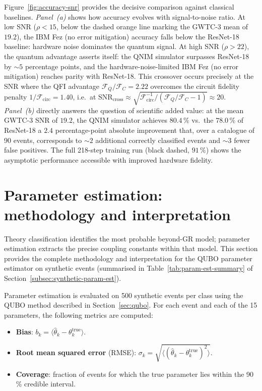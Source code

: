 \documentclass[11pt,a4paper, english]{book}
\theoremstyle{plain}
\theoremstyle{definition}
\numberwithin{equation}{chapter}
\numberwithin{figure}{chapter}
\numberwithin{table}{chapter}
\begin{document}
Figure~\ref{fig:accuracy-snr} provides the decisive comparison against
classical baselines.
\emph{Panel~(a)} shows how accuracy evolves with signal-to-noise ratio.
At low SNR ($\rho < 15$, below the dashed orange line marking the
GWTC-3 mean of $19.2$), the IBM Fez (no error mitigation) accuracy falls below the
ResNet-18 baseline: hardware noise dominates the quantum signal.  At
high SNR ($\rho > 22$), the quantum advantage asserts itself: the QNIM
simulator surpasses ResNet-18 by $\sim\!5$ percentage points, and the
hardware-noise-limited IBM Fez (no error mitigation) reaches parity with ResNet-18.
This crossover occurs precisely at the SNR where
the QFI advantage $\mathcal{F}_Q/\mathcal{F}_C = 2.22$ overcomes the
circuit fidelity penalty $1/\mathcal{F}_\mathrm{circ} = 1.40$, i.e.\ at
$\mathrm{SNR}_\mathrm{cross} \approx \sqrt{\mathcal{F}_\mathrm{circ}^{-1}
/ (\mathcal{F}_Q/\mathcal{F}_C - 1)} \approx 20$.
\emph{Panel~(b)} directly answers the question of scientific added
value: at the mean GWTC-3 SNR of $19.2$, the QNIM simulator achieves
$80.4\,\%$ vs.\ the $78.0\,\%$ of ResNet-18  a $2.4$ percentage-point
absolute improvement that, over a catalogue of 90 events, corresponds
to $\sim\!2$ additional correctly classified events and $\sim\!3$ fewer
false positives.  The full 218-step training run (black dashed,
$91\,\%$) shows the asymptotic performance accessible with
improved hardware fidelity.

\section{Parameter estimation: methodology and interpretation}
\label{app:pe-detail}

Theory classification identifies the most probable beyond-GR model; parameter
estimation extracts the precise coupling constants within that model.  This section
provides the complete methodology and interpretation for the QUBO parameter
estimator on synthetic events (summarised in Table~\ref{tab:param-est-summary}
of Section~\ref{subsec:synthetic-param-est}).

Parameter estimation is evaluated on 500 synthetic events per class
using the QUBO method described in Section~\ref{sec:qubo}.  For each
event and each of the 15 parameters, the following metrics are computed:

\begin{itemize}
  \item \textbf{Bias}: $b_k = \langle\hat{\theta}_k - \theta_k^\mathrm{true}\rangle$.
  \item \textbf{Root mean squared error} (RMSE):
        $\sigma_k = \sqrt{\langle(\hat{\theta}_k - \theta_k^\mathrm{true})^2\rangle}$.
  \item \textbf{Coverage}: fraction of events for which the true parameter
        lies within the 90\,\% credible interval.
\end{itemize}
\end{document}
